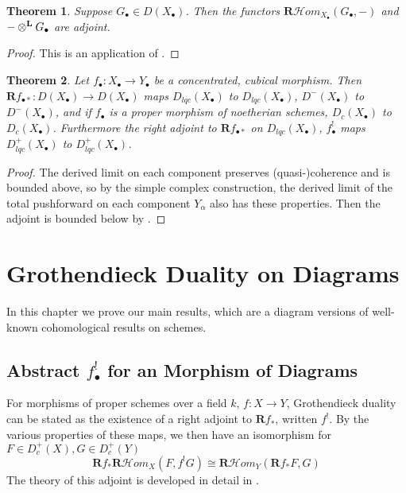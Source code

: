 \documentclass[proquest]{uwthesis}[2014/11/13]
\newtheorem{theorem}{Theorem}[section]
\theoremstyle{definition}
\newcommand{\cHom}{\mathcal{H} \textit{om}}
\newcommand{\bR}{\textbf{R}}
\newcommand{\otimesL}{\otimes^{\bf L}}
\begin{document}
\begin{theorem}
	Suppose $G_\bullet \in D(X_\bullet)$.
	Then the functors $\bR \cHom_{X_\bullet}(G_\bullet, -)$ and $-\otimesL G_\bullet$ are adjoint.
\end{theorem}
\begin{proof}
	This is an application of \cite[Tag 09T5]{stacks}.
\end{proof}

\begin{theorem}
	\label{thm:pushforwardbounds}
	Let $f_\bullet : X_\bullet \rightarrow Y_\bullet$ be a concentrated, cubical morphism.
	Then ${\bR f_{\bullet *} : D(X_\bullet) \rightarrow D(X_\bullet)}$ maps $D_{lqc}(X_\bullet)$ to $D_{lqc}(X_\bullet)$, $D^-(X_\bullet)$ to $D^-(X_\bullet)$, and if $f_\bullet$ is a proper morphism of noetherian schemes, $D_c(X_\bullet)$ to $D_c(X_\bullet)$.
	Furthermore the right adjoint to $\bR f_{\bullet *}$ on $D_{lqc}(X_\bullet)$, $f_\bullet^!$ maps $D_{lqc}^+(X_\bullet)$ to $D_{lqc}^+(X_\bullet)$.
\end{theorem}
\begin{proof}
	The derived limit on each component preserves (quasi-)coherence and is bounded above, so by the simple complex construction, the derived limit of the total pushforward on each component $Y_\alpha$ also has these properties.
	Then the adjoint is bounded below by \cite[Lemma 4.1.8]{Lipman2009}.
\end{proof}

\chapter{Grothendieck Duality on Diagrams}
\label{chp:grothendieckduality}

In this chapter we prove our main results, which are a diagram versions of well-known cohomological results on schemes.

\section{Abstract $f_\bullet^!$ for an Morphism of Diagrams}
For morphisms of proper schemes over a field $k$, $f : X \rightarrow Y$, Grothendieck duality can be stated as the existence of a right adjoint to $\bR f_*$, written $f^!$.
By the various properties of these maps, we then have an isomorphism for $F \in D_{c}^+(X), G \in D_{c}^+(Y)$
\[
\bR f_* \bR \cHom_X(F, f^! G) \cong \bR \cHom_Y(\bR f_* F, G)
\]
The theory of this adjoint is developed in detail in \cite{Hartshorne1966}.
\end{document}
